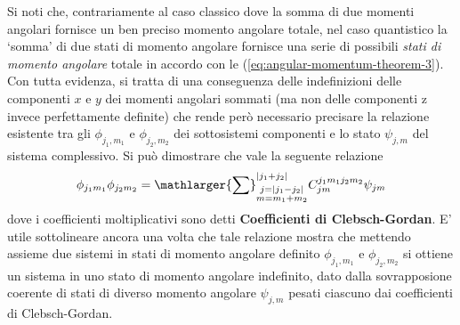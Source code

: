 Si noti che, contrariamente al caso classico dove la somma di due momenti angolari fornisce un ben preciso momento angolare totale, nel
caso quantistico la ‘somma’ di due stati di momento angolare fornisce una serie di possibili \emph{stati di momento angolare} 
totale in accordo con le (\ref{eq:angular-momentum-theorem-3}). 
Con tutta evidenza, si tratta di una conseguenza delle indefinizioni delle componenti $x$ e $y$ dei momenti angolari sommati 
(ma non delle componenti z invece perfettamente definite) che rende però necessario precisare la relazione esistente tra gli
$ \phi_{j_1,m_1}$ e $ \phi_{j_2,m_2}$ dei sottosistemi componenti e lo stato $ \psi_{j,m}$ del sistema complessivo.
Si può dimostrare che vale la seguente relazione
\begin{equation}
    \phi_{j_{1}m_{1}} \phi_{j_{2}m_{2}} = \mathlarger{\sum}_{\substack{j=| j_{1}-j_{2}| \\ m = m_{1}+m_{2}} }^{| j_{1}+j_{2}|} C_{jm}^{j_{1}m_{1}j_{2}m_{2}} \psi_{jm}
   \label{eq:clebsch-gordan-def}
\end{equation}
dove i coefficienti moltiplicativi sono detti \textbf{Coefficienti di Clebsch-Gordan}.
E’ utile sottolineare ancora una volta che tale relazione mostra che mettendo assieme due sistemi in stati di momento angolare definito $\phi_{j_{1},m_{1}}$ e $\phi_{j_{2},m_{2}}$ si ottiene un sistema in uno stato di momento angolare indefinito, dato dalla sovrapposione coerente di stati di diverso momento angolare $\psi_{j,m}$ pesati ciascuno dai coefficienti di Clebsch-Gordan.

